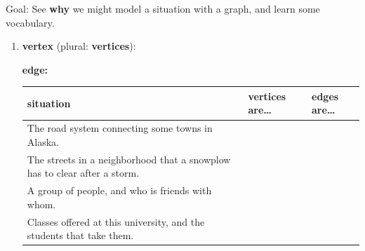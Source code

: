 \documentclass[12pt]{article}
\renewcommand{\emph}[1]{\textsf{\textbf{#1}}}
\begin{document}
Goal: See \emph{why} we might model a situation with a graph, and learn some vocabulary.

\begin{enumerate}
\item  %
%


\vspace{.1in}

\emph{vertex} (plural: \emph{vertices}):  %

\emph{edge:}  %






\vspace{.1in}


{\renewcommand{\arraystretch}{2.4}
\begin{tabularx}{\linewidth}{|p{3.5in}|X|X|}
\hline
\emph{situation} & \emph{vertices are\ldots} & \emph{edges are\ldots} \\ \hline
The road system connecting some towns in Alaska. & & \\ \hline
The streets in a neighborhood that a snowplow has to clear after a storm. & & \\ \hline
A group of people, and who is friends with whom. & & \\ \hline
Classes offered at this university, and the students that take them. & & \\[.42in] \hline
\end{tabularx}
}

\vspace{.15in}


\end{enumerate}
\end{document}
